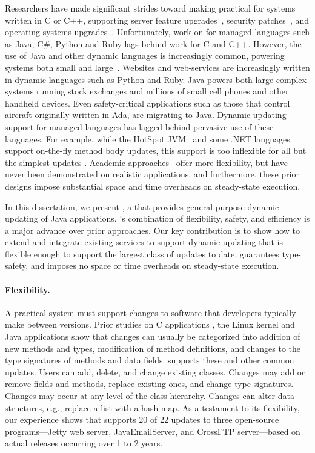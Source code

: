 Researchers have made significant strides toward making \USD practical for
systems written in C or C++, supporting server feature
upgrades~\cite{neamtiu06dsu, chen:icse07, upstare}, security
patches~\cite{altekar05opus}, and operating systems
upgrades~\cite{K42reconfig, k42usenix, baumann07reboots, baumann04workshop,
dynamos_eurosys_07, chen06vee, ksplice}.  Unfortunately, work on \USD for
managed languages such as Java, C\#, Python and Ruby lags behind work for C
and C++.  However, the use of Java and other dynamic languages is increasingly
common, powering systems both small and large~\cite{gartner-java,
ibm-nyse-java, cell-phones, pizlo09, sdtimes}.
Websites and web-services are increasingly written in dynamic languages such as Python
and Ruby. Java powers both large complex systems running stock exchanges
and millions of small cell phones and other handheld devices.  Even
safety-critical
applications such as those that control aircraft originally written in
Ada, are migrating to Java. Dynamic updating
support for managed languages has lagged behind pervasive use of these
languages. For example, while the HotSpot JVM~\cite{JVMhotswap} and some
.NET languages~\cite{VSEnC} support on-the-fly method body updates, this
support is too inflexible for all but the simplest updates \cite{jvolve}.
Academic approaches~\cite{ritzau00dynamic, Mala00a, orso:java,
bierman08upgradej} offer more flexibility, but have never been demonstrated on
realistic applications, and furthermore, these prior designs impose
substantial space and time overheads on steady-state execution.

In this dissertation, we present \JV, a \JVM that provides general-purpose
dynamic updating of Java applications. \JV's combination of flexibility,
safety, and efficiency is a major advance over prior approaches. Our key
contribution is to show how to extend and integrate existing \VM services
to support dynamic updating that is flexible enough to support the largest class of
updates to date, guarantees type-safety, and imposes no space or time overheads on
steady-state execution.

\paragraph{Flexibility.}
A practical \USD system must support changes to software that developers
typically make between versions. Prior studies on C applications
\cite{neamtiu05evolution}, the Linux kernel \cite{linux-evolution} and Java
applications \cite{java-evolution} show that changes can usually be
categorized into addition of new methods and types, modification of method
definitions, and changes to the type signatures of methods and data fields.
%
\JV supports these and other common updates. Users can add, delete, and change
existing classes.  Changes may add or remove fields and methods, replace
existing ones, and change type signatures.  Changes may occur at any level
of the class hierarchy. Changes can alter data structures, e.g., replace a
list with a hash map.
As a testament to its flexibility, our experience shows that \JV supports
20 of 22
updates to three open-source programs---Jetty web server, JavaEmailServer,
and CrossFTP server---based on actual releases occurring over 1 to 2 years.

